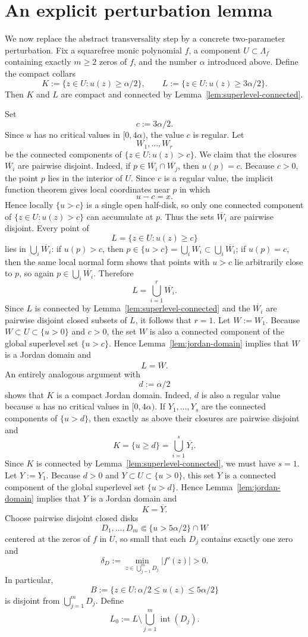 \documentclass[12pt]{amsart}
\theoremstyle{definition}
\theoremstyle{remark}
\begin{document}
\section{An explicit perturbation lemma}

We now replace the abstract transversality step by a concrete two-parameter perturbation. Fix a
squarefree monic polynomial $f$, a component $U\subset \Lambda_f$ containing exactly $m\ge 2$ zeros of $f$, and the
number $\alpha$ introduced above. Define the compact collars
\[
K:=\{z\in U:u(z)\ge \alpha/2\},\qquad L:=\{z\in U:u(z)\ge 3\alpha/2\}.
\]
Then $K$ and $L$ are compact and connected by Lemma~\ref{lem:superlevel-connected}.

\indent Set
\[
 c:=3\alpha/2.
\]
Since $u$ has no critical values in $[0,4\alpha)$, the value $c$ is regular. Let
\[
W_1,\dots,W_r
\]
be the connected components of $\{z\in U:u(z)>c\}$. We claim that the closures $\overline{W_i}$ are pairwise
disjoint. Indeed, if $p\in \overline{W_i}\cap\overline{W_j}$, then $u(p)=c$. Because $c>0$, the point $p$ lies in the interior of $U$.
Since $c$ is a regular value, the implicit function theorem gives local coordinates near $p$ in which
\[
 u-c=x.
\]
Hence locally $\{u>c\}$ is a single open half-disk, so only one connected component of $\{z\in U:u(z)>c\}$ can
accumulate at $p$. Thus the sets $\overline{W_i}$ are pairwise disjoint. Every point of
\[
 L=\{z\in U:u(z)\ge c\}
\]
lies in $\bigcup_i \overline{W_i}$: if $u(p)>c$, then $p\in\{u>c\}=\bigcup_i W_i\subset
\bigcup_i \overline{W_i}$; if $u(p)=c$, then the same local normal form shows that points with
$u>c$ lie arbitrarily close to $p$, so again $p\in\bigcup_i \overline{W_i}$. Therefore
\[
L=\bigcup_{i=1}^r \overline{W_i}.
\]
Since $L$ is connected by Lemma~\ref{lem:superlevel-connected} and the $\overline{W_i}$ are pairwise disjoint closed subsets of $L$, it follows
that $r=1$. Let $W:=W_1$. Because $W\subset U\subset\{u>0\}$ and $c>0$, the set $W$ is also a connected
component of the global superlevel set $\{u>c\}$. Hence Lemma~\ref{lem:jordan-domain} implies that $W$ is a Jordan domain and
\[
L=\overline W.
\]
An entirely analogous argument with
\[
 d:=\alpha/2
\]
shows that $K$ is a compact Jordan domain. Indeed, $d$ is also a regular value because $u$ has no critical
values in $[0,4\alpha)$. If $Y_1,\dots,Y_s$ are the connected components of $\{u>d\}$, then exactly as above their
closures are pairwise disjoint and
\[
K=\{u\ge d\}=\bigcup_{i=1}^s \overline{Y_i}.
\]
Since $K$ is connected by Lemma~\ref{lem:superlevel-connected}, we must have $s=1$. Let $Y:=Y_1$. Because $d>0$ and $Y\subset U\subset\{u>0\}$,
this set $Y$ is a connected component of the global superlevel set $\{u>d\}$. Hence Lemma~\ref{lem:jordan-domain} implies that $Y$
is a Jordan domain and
\[
K=\overline Y.
\]
Choose pairwise disjoint closed disks
\[
D_1,\dots,D_m\Subset \{u>5\alpha/2\}\cap W
\]
centered at the zeros of $f$ in $U$, so small that each $D_j$ contains exactly one
zero and
\[
\delta_D:=\min_{z\in \bigcup_{j=1}^m D_j}|f'(z)|>0.
\]
In particular,
\[
B:=\{z\in U:\alpha/2\le u(z)\le 5\alpha/2\}
\]
is disjoint from $\bigcup_{j=1}^m D_j$. Define
\[
L_0:=L\setminus \bigcup_{j=1}^m \operatorname{int}(D_j).
\]
\end{document}
